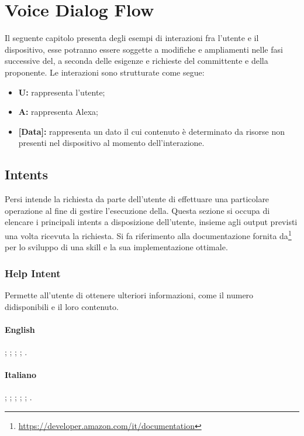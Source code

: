 \chapter{Voice Dialog Flow}

Il seguente capitolo presenta degli esempi di interazioni fra l'utente e il dispositivo, esse potranno essere soggette a modifiche e ampliamenti nelle fasi successive del, a seconda delle esigenze e richieste del committente e della proponente.
Le interazioni sono strutturate come segue:
\begin{itemize}
	\item \textbf{U:} rappresenta l'utente;
	\item \textbf{A:} rappresenta Alexa;
	\item \textbf{[Data]:} rappresenta un dato il cui contenuto è determinato da risorse non presenti nel dispositivo al momento dell'interazione.
\end{itemize}


\section{Intents}
Persi intende la richiesta da parte dell'utente di effettuare una particolare operazione al fine di gestire l'esecuzione della. 
Questa sezione si occupa di elencare i principali intents a disposizione dell'utente, insieme agli output previsti una volta ricevuta la richiesta.
Si fa riferimento alla documentazione fornita da\footnote{\url{https://developer.amazon.com/it/documentation}} per lo sviluppo di una skill e la sua implementazione ottimale.

\subsection{Help Intent}\label{help}
Permette all'utente di ottenere ulteriori informazioni, come il numero didisponibili e il loro contenuto.
\subsubsection{English}
\begin{itemize}
	;
	;
	;
	;
	.	
\end{itemize}
\subsubsection{Italiano}
\begin{itemize}
	;
	;
	;
	;
	;
	.
\end{itemize}

